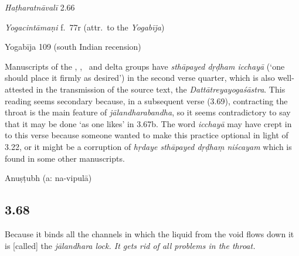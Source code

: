 \begin{ekdosis}
\begin{testimonia}[hp03_067]
\emph{Haṭharatnāvalī} 2.66
\begin{versinnote}
\end{versinnote}

\emph{Yogacintāmaṇi} f.~77r (attr.~to the \emph{Yogabīja})
\begin{versinnote}
\end{versinnote}

Yogabīja 109 (south Indian recension)
\begin{versinnote}
\tl{\var{amṛtāvyaya°] amṛtavyaya° \vl}\\!}
\end{versinnote}

\end{testimonia}

\begin{philcomm}[hp03_067]
Manuscripts of the \textalpha, \textbeta, \texteta\ and delta groups have \emph{sthāpayed dṛḍham icchayā} (`one should place it firmly as desired') in the second verse quarter, which is also well-attested in the transmission of the source text, the \emph{Dattātreyayogaśāstra}. This reading seems secondary because, in a subsequent verse (3.69), contracting the throat is the main feature of \emph{jālandharabandha}, so it seems contradictory to say that it may be done `as one likes' in 3.67b. The word \emph{icchayā} may have crept in to this verse because someone wanted to make this practice optional in light of 3.22, or it might be a corruption of \emph{hṛdaye sthāpayed dṛḍhaṃ niścayam} which is found in some other manuscripts.
\end{philcomm}

\begin{metre}[hp03_067]
Anuṣṭubh (a: na-vipulā)
\end{metre}

\subsection*{3.68}
\begin{translation}[hp03_068]
Because it binds all the channels in which the liquid from the void flows down it is [called] the \sl{jālandhara} lock. It gets rid of all problems in the throat.%
\end{translation}


\end{ekdosis}
